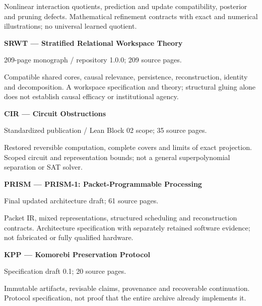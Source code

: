 Nonlinear interaction quotients, prediction and update compatibility, posterior and pruning defects. Mathematical refinement contracts with exact and numerical illustrations; no universal learned quotient.\par

\hypertarget{cat:SRWT}{}\textbf{SRWT --- Stratified Relational Workspace Theory}\par

209-page monograph / repository 1.0.0; 209 source pages.\par

Compatible shared cores, causal relevance, persistence, reconstruction, identity and decomposition. A workspace specification and theory; structural gluing alone does not establish causal efficacy or institutional agency.\par

\hypertarget{cat:CIR}{}\textbf{CIR --- Circuit Obstructions}\par

Standardized publication / Lean Block 02 scope; 35 source pages.\par

Restored reversible computation, complete covers and limits of exact projection. Scoped circuit and representation bounds; not a general superpolynomial separation or SAT solver.\par

\hypertarget{cat:PRISM}{}\textbf{PRISM --- PRISM-1: Packet-Programmable Processing}\par

Final updated architecture draft; 61 source pages.\par

Packet IR, mixed representations, structured scheduling and reconstruction contracts. Architecture specification with separately retained software evidence; not fabricated or fully qualified hardware.\par

\hypertarget{cat:KPP}{}\textbf{KPP --- Komorebi Preservation Protocol}\par

Specification draft 0.1; 20 source pages.\par

Immutable artifacts, revisable claims, provenance and recoverable continuation. Protocol specification, not proof that the entire archive already implements it.\par

